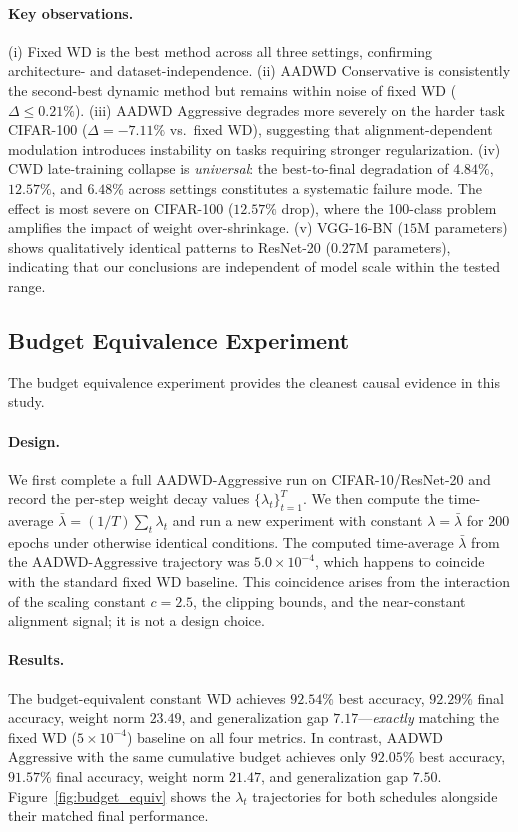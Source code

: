 \documentclass{article}
\begin{document}
\paragraph{Key observations.}
(i) Fixed WD is the best method across all three settings, confirming
architecture- and dataset-independence.
(ii) AADWD Conservative is consistently the second-best dynamic method but remains
within noise of fixed WD ($\Delta \leq 0.21\%$).
(iii) AADWD Aggressive degrades more severely on the harder task CIFAR-100
($\Delta = -7.11\%$ vs.\ fixed WD), suggesting that alignment-dependent modulation
introduces instability on tasks requiring stronger regularization.
(iv) CWD late-training collapse is \emph{universal}: the best-to-final degradation
of $4.84\%$, $12.57\%$, and $6.48\%$ across settings constitutes a systematic
failure mode.
The effect is most severe on CIFAR-100 ($12.57\%$ drop), where the 100-class problem
amplifies the impact of weight over-shrinkage.
(v) VGG-16-BN ($15$M parameters) shows qualitatively identical patterns to ResNet-20
($0.27$M parameters), indicating that our conclusions are independent of model scale
within the tested range.

\subsection{Budget Equivalence Experiment}
\label{sec:budget}

The budget equivalence experiment provides the cleanest causal evidence in this
study.

\paragraph{Design.}
We first complete a full AADWD-Aggressive run on CIFAR-10/ResNet-20 and record the
per-step weight decay values $\{\lambda_t\}_{t=1}^T$.
We then compute the time-average
$\bar{\lambda} = (1/T)\sum_t \lambda_t$
and run a new experiment with constant $\lambda = \bar{\lambda}$ for 200 epochs
under otherwise identical conditions.
The computed time-average $\bar{\lambda}$ from the AADWD-Aggressive trajectory was
$5.0 \times 10^{-4}$, which happens to coincide with the standard fixed WD baseline.
This coincidence arises from the interaction of the scaling constant $c = 2.5$, the
clipping bounds, and the near-constant alignment signal; it is not a design choice.

\paragraph{Results.}
The budget-equivalent constant WD achieves $92.54\%$ best accuracy, $92.29\%$ final
accuracy, weight norm $23.49$, and generalization gap $7.17$---\emph{exactly}
matching the fixed WD ($5 \times 10^{-4}$) baseline on all four metrics.
In contrast, AADWD Aggressive with the same cumulative budget achieves only $92.05\%$
best accuracy, $91.57\%$ final accuracy, weight norm $21.47$, and generalization gap
$7.50$.
Figure~\ref{fig:budget_equiv} shows the $\lambda_t$ trajectories for both schedules
alongside their matched final performance.
\end{document}
